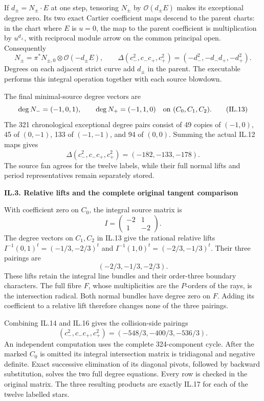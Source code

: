 If \(d_\pm=N_\pm\cdot E\) at one step, tensoring \(N_\pm\) by
\(\mathcal O(d_\pm E)\) makes its exceptional degree zero. Its
two exact Cartier coefficient maps descend to the parent charts:
in the chart where \(E\) is \(u=0\), the map to the parent
coefficient is multiplication by \(u^{d_\pm}\), with reciprocal
module arrow on the common principal open. Consequently
\[
 N_\pm=\pi^*N_{\pm,0}\otimes\mathcal O(-d_\pm E),\qquad
 \Delta(c_-^2,c_-c_+,c_+^2)=(-d_-^2,-d_-d_+,-d_+^2).
 \tag{IL.12}
\]
Degrees on each adjacent strict curve add \(d_\pm\) in the
parent. The executable performs this integral operation together
with each source blowdown.

The final minimal-source degree vectors are
\[
 \deg N_-=(-1,0,1),\qquad \deg N_+=(-1,1,0)
                  \quad\hbox{on }(C_0,C_1,C_2).
 \tag{IL.13}
\]
The 321 chronological exceptional degree pairs consist of 49
copies of \((-1,0)\), 45 of \((0,-1)\), 133 of \((-1,-1)\),
and 94 of \((0,0)\). Summing the actual IL.12 maps gives
\[
       \Delta(c_-^2,c_-c_+,c_+^2)=(-182,-133,-178).
 \tag{IL.14}
\]
The source fan agrees for the twelve labels, while their full
normal lifts and period representatives remain separately stored.

\par

\medskip\noindent\textbf{IL.3. Relative lifts and the complete original tangent comparison}

\par\nobreak

With coefficient zero on \(C_0\), the integral source matrix is
\[
 I=\begin{pmatrix}-2&1\\1&-2\end{pmatrix}.
 \tag{IL.15}
\]
The degree vectors on \(C_1,C_2\) in IL.13 give the rational
relative lifts \(I^{-1}(0,1)^t=(-1/3,-2/3)^t\) and
\(I^{-1}(1,0)^t=(-2/3,-1/3)^t\). Their three pairings are
\[
        (-2/3,-1/3,-2/3).
 \tag{IL.16}
\]
These lifts retain the integral line bundles and their order-three
boundary characters. The full fibre \(F\), whose multiplicities
are the \(P\)-orders of the rays, is the intersection radical.
Both normal bundles have degree zero on \(F\). Adding its
coefficient to a relative lift therefore changes none of the
three pairings.

Combining IL.14 and IL.16 gives the collision-side pairings
\[
        (c_-^2,c_-c_+,c_+^2)=(-548/3,-400/3,-536/3).
 \tag{IL.17}
\]
An independent computation uses the complete 324-component cycle.
After the marked \(C_0\) is omitted its integral intersection
matrix is tridiagonal and negative definite. Exact successive
elimination of its diagonal pivots, followed by backward
substitution, solves the two full degree equations. Every row
is checked in the original matrix. The three resulting products
are exactly IL.17 for each of the twelve labelled stars.

